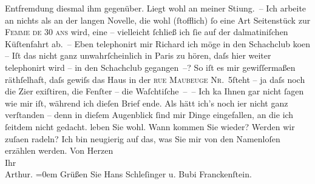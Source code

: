 \begin{ledgroupsized}[t]{13cm}
               Entfremdung diesmal ihm gegenüber. Liegt wohl an meiner Sti{\geminationm}ung. –\pend
           \pstart
           Ich arbeite an nichts als an der langen Novelle, die wohl (ſtofflich) ſo eine Art Seitenstück zur
                  \textsc{Femme de 30 ans} wird, eine \label{K_L01024-2v}\label{K_L01024-2h}
               – viel{\pb}leicht ſchließ ich ſie auf der dalmatiniſchen Küſtenfahrt ab. –\pend
           \pstart
           Eben telephonirt mir Richard ich möge in den
                  Schachclub ko{\geminationm}en
               – Iſt das nicht ganz unwahrſcheinlich in Paris zu
               hören, daſs hier weiter telephonirt wird – in den Schachclub gegangen –? So iſt es mir gewiſſermaßen räthſelhaft, daſs gewiſs
               das Haus {\pb}in der \textsc{rue Maubeuge Nr. 5}ſteht – ja daſs noch die Zi{\geminationm}er exiſtiren, die Fenſter – die Waſchtiſche – –\pend
           \pstart
           Ich ka{\geminationn} Ihnen gar nicht ſagen wie mir iſt, während ich
               dieſen Brief ende. Als hätt ich’s noch i{\geminationm}er nicht ganz
                  verſtanden – denn in
               dieſem Augenblick ſind mir Dinge eingefallen, an die ich ſeitdem nicht gedacht.\pend
           \pstart
           {\pb}leben Sie wohl. Wann kommen Sie wieder? Werden wir
                  zuſa{\geminationm}en radeln? Ich bin neugierig auf das, was Sie
               mir von den Namenloſen erzählen werden.\pend
           \pstart
           Von Herzen{\\[\baselineskip]}Ihr{\\[\baselineskip]}\spacefill\mbox{Arthur.}\pend
           \leftskip=0em{}\pstart
           Grüßen Sie Hans Schleſinger u. Bubi Franckenſtein.\pend
           
         
         \endnumbering{}\end{ledgroupsized}  \newcommand{\dateiname}{L01024}\newcommand{\titel}{Arthur Schnitzler an Hugo von Hofmannsthal, 23. 3. 1900}\newcommand{\editorInnen}{Martin Anton Müller und Gerd-Hermann Susen}
      